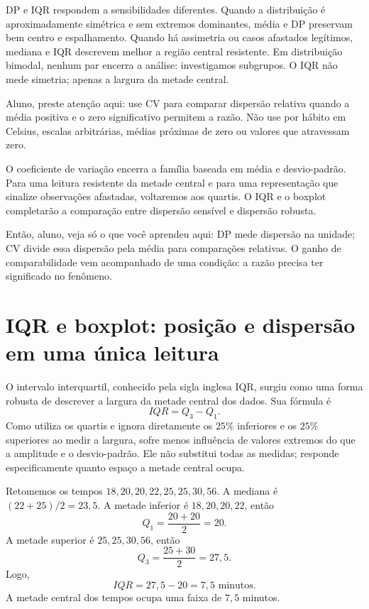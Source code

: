 DP e IQR respondem a sensibilidades diferentes. Quando a distribuição é aproximadamente simétrica e sem extremos dominantes, média e DP preservam bem centro e espalhamento. Quando há assimetria ou casos afastados legítimos, mediana e IQR descrevem melhor a região central resistente. Em distribuição bimodal, nenhum par encerra a análise: investigamos subgrupos. O IQR não mede simetria; apenas a largura da metade central.

\begin{GuidedBox}
Aluno, preste atenção aqui: use CV para comparar dispersão relativa quando a média positiva e o zero significativo permitem a razão. Não use por hábito em Celsius, escalas arbitrárias, médias próximas de zero ou valores que atravessam zero.
\end{GuidedBox}

O coeficiente de variação encerra a família baseada em média e desvio-padrão. Para uma leitura resistente da metade central e para uma representação que sinalize observações afastadas, voltaremos aos quartis. O IQR e o boxplot completarão a comparação entre dispersão sensível e dispersão robusta.

\begin{SummaryBox}
Então, aluno, veja só o que você aprendeu aqui: DP mede dispersão na unidade; CV divide essa dispersão pela média para comparações relativas. O ganho de comparabilidade vem acompanhado de uma condição: a razão precisa ter significado no fenômeno.
\end{SummaryBox}

\section{IQR e boxplot: posição e dispersão em uma única leitura}

O intervalo interquartil, conhecido pela sigla inglesa IQR, surgiu como uma forma robusta de descrever a largura da metade central dos dados. Sua fórmula é
\[
IQR=Q_3-Q_1.
\]
Como utiliza os quartis e ignora diretamente os $25\%$ inferiores e os $25\%$ superiores ao medir a largura, sofre menos influência de valores extremos do que a amplitude e o desvio-padrão. Ele não substitui todas as medidas; responde especificamente quanto espaço a metade central ocupa.

Retomemos os tempos ${18,20,20,22,25,25,30,56}$. A mediana é $(22+25)/2=23{,}5$. A metade inferior é ${18,20,20,22}$, então
\[
Q_1=\frac{20+20}{2}=20.
\]
A metade superior é ${25,25,30,56}$, então
\[
Q_3=\frac{25+30}{2}=27{,}5.
\]
Logo,
\[
IQR=27{,}5-20=7{,}5\text{ minutos}.
\]
A metade central dos tempos ocupa uma faixa de $7{,}5$ minutos.

